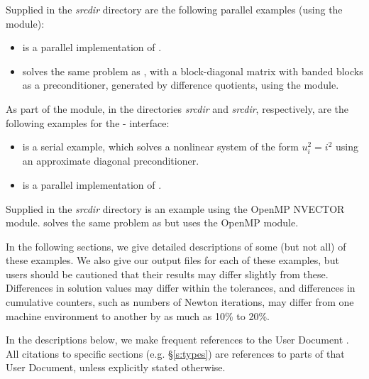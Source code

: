\vspace{0.2in}\noindent
Supplied in the {\em srcdir} directory are
the following parallel examples (using the {\nvecp} module):
\begin{itemize}
\item {}
  is a parallel implementation of .
\item {}
  solves the same problem as , with a block-diagonal matrix
  with banded blocks as a preconditioner, generated by difference quotients,
  using the {\kinbbdpre} module.
\end{itemize}

\vspace{0.2in}\noindent
As part of the {\fkinsol} module, in the directories 
{\em srcdir} and
{\em srcdir}, respectively, are the
following examples for the {\F}-{\CC} interface:
\begin{itemize}
\item {}
  is a serial example, which solves a nonlinear system of the form
  $u_i^2 = i^2$ using an approximate diagonal preconditioner.
\item {}
  is a parallel implementation of .
\end{itemize}

\vspace{0.2in}\noindent
Supplied in the {\em srcdir} directory
is an example using the OpenMP NVECTOR module.
 solves the same problem as
 but uses the OpenMP module.


\vspace{0.2in}\noindent 
In the following sections, we give detailed descriptions of some (but
not all) of these examples.  We also give our output files for
each of these examples, but users should be cautioned that their
results may differ slightly from these.  Differences in solution
values may differ within the tolerances, and differences in cumulative
counters, such as numbers of Newton iterations, may differ
from one machine environment to another by as much as 10\% to 20\%.

In the descriptions below, we make frequent references to the {\kinsol}
User Document \cite{kinsol_ug}.  All citations to specific sections
(e.g. \S\ref{s:types}) are references to parts of that User Document, unless
explicitly stated otherwise.

